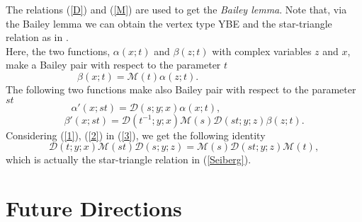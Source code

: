 \documentclass[a4paper,11pt]{article}%
\numberwithin{equation}{section}
\begin{document}
The relations (\ref{D}) and (\ref{M}) are used to get the \emph{Bailey lemma}. Note that, via the Bailey lemma we can obtain the vertex type YBE and the star-triangle relation as in \cite{Derkachov:2012iv,Gahramanov:2015cva}.\\
Here, the two functions, $\alpha(x;t)$ and $\beta(z;t)$ with complex variables $z$ and $x$, make a Bailey pair with respect to the parameter $t$ 
\begin{equation}\label{1}
    \beta(x;t)=\mathcal{M}(t)\alpha(z;t).\qquad\qquad\qquad\qquad\quad\,\,
\end{equation}
The following two functions make also Bailey pair with respect to the parameter $st$
\begin{equation}\label{2}
    \alpha'(x;st)=\mathcal{D}(s;y;x) \alpha(x;t),\qquad\qquad\qquad\quad\,\,\,\,
\end{equation}
\begin{equation}\label{3}
    \beta'(x;st)=\mathcal{D}(t^{-1};y;x)\mathcal{M}(s)\mathcal{D}(st;y;z)\beta(z;t).
\end{equation}
Considering (\ref{1}), (\ref{2}) in (\ref{3}), we  get the following identity 
\begin{equation}
     \mathcal{D}(t;y;x)\mathcal{M}(st)\mathcal{D}(s;y;z)=\mathcal{M}(s)\mathcal{D}(st;y;z)\mathcal{M}(t),
\end{equation}
which is actually the star-triangle relation in (\ref{Seiberg}).






\section{Future Directions} \label{fu}
\end{document}
